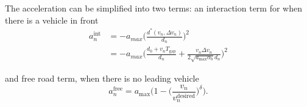 The acceleration can be simplified into two terms: an interaction term for when there is a vehicle in front 
\begin{align}
     a^\text{int}_n &=  -a_{max} \Big(\frac{d^*(v_n,\Delta v_n)}{d_n} \Big) ^2  \nonumber \\
     &= -a_{max} \Big(\frac{d_0 + v_n T_{\mathrm{gap}}}{d_n} + \frac{v_n \Delta v_n}{2 \sqrt{a_{\mathrm{max}} \alpha_b} d_n} \Big) ^2
     \label{eq:idm_int}
\end{align}

and free road term, when there is no leading vehicle
\begin{equation}
    a^\text{free}_n= a_\mathrm{max}\Big(1-\Big(\frac{v_n}{v^\mathrm{desired}_n}\Big)^\delta\Big).
    \label{eq:idm_free}
\end{equation}


